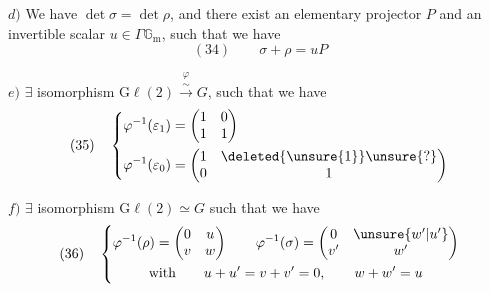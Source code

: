 $d)$ We have $\det\sigma=\det\rho$, and there exist an elementary projector $P$ and an invertible scalar $u\in\Gamma\mathbb G_{\mathrm m}$, such that we have
\[
(34)\qquad \sigma+\rho=uP
\]




$e)$ $\exists$ isomorphism $\mathrm{G}\ell(2)\overset{\varphi}{\xrightarrow{\sim}}G$,  such that we have
\[
(35)\quad\left\{\begin{aligned}
\varphi^{-1}(\varepsilon_1)&=\begin{pmatrix}1&0\\1&1\end{pmatrix}\\
\varphi^{-1}(\varepsilon_0)&=\begin{pmatrix}1&\deleted{\unsure{1}}\unsure{?}\\0&1\end{pmatrix}
\end{aligned}\right.
\]

$f)$ $\exists$ isomorphism $\mathrm{G}\ell(2)\simeq G$ such that we have
\[
(36)\quad\left\{\begin{gathered}
\varphi^{-1}(\rho)=\begin{pmatrix}0&u\\v&w\end{pmatrix}\qquad
\varphi^{-1}(\sigma)=\begin{pmatrix}0&\unsure{w'|u'}\\v'&w'\end{pmatrix}\\
\text{with}\qquad u+u'=v+v'=0,\qquad w+w'=u
\end{gathered}\right.
\]

